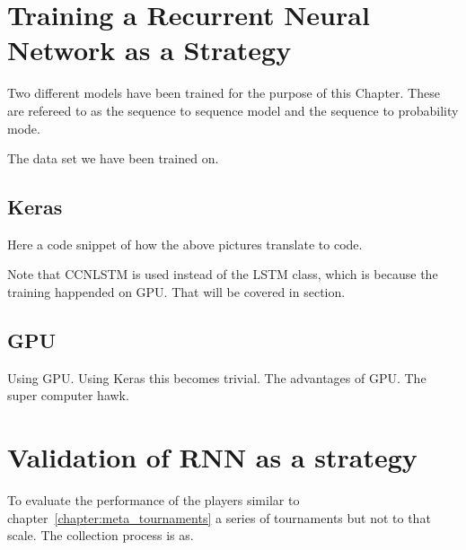 \section{Training a Recurrent Neural Network as a Strategy}\label{section:training_a_rnn}

Two different models have been trained for the purpose of this Chapter. These
are refereed to as the sequence to sequence model and the sequence to
probability mode.

\begin{figure}[!htbp]
    \centering
    
\end{figure}

The data set we have been trained on.

\subsection{Keras}

Here a code snippet of how the above pictures translate to code.

Note that CCNLSTM is used instead of the LSTM class, which is because the training
happended on GPU. That will be covered in section.

\subsection{GPU}

Using GPU. Using Keras this becomes trivial. The advantages of GPU. The super
computer hawk.

\section{Validation of RNN as a strategy}\label{section:rnn_strategy_validation}

To evaluate the performance of the players similar to chapter~\ref{chapter:meta_tournaments}
a series of tournaments but not to that scale. The collection process is as.

\begin{table}[!htbp]
    \begin{center}
    \end{center}
    \caption{Data collection; parameters' values}
    \label{table:parameters_values}
\end{table}


